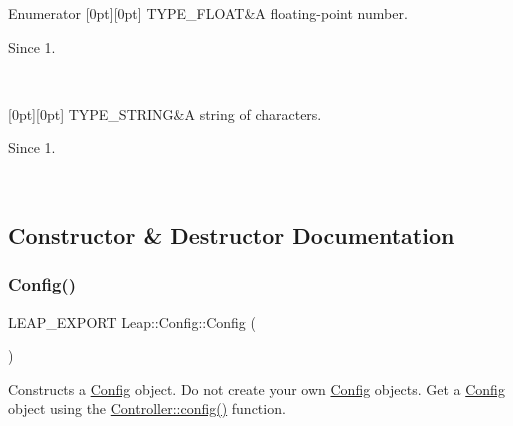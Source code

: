 \begin{DoxyEnumFields}{Enumerator}
[0pt][0pt]{}\mbox{\label{class_leap_1_1_config_aee9819af7eacacc324aa72619310a9d8a85ccbf5a55972697b350b394f7d87cfa}} 
T\+Y\+P\+E\+\_\+\+F\+L\+O\+AT&A floating-\/point number. \begin{DoxySince}{Since}
1. 
\end{DoxySince}
\\
\hline

[0pt][0pt]{}\mbox{\label{class_leap_1_1_config_aee9819af7eacacc324aa72619310a9d8a312ad72cfe51163b2817732f7530e04e}} 
T\+Y\+P\+E\+\_\+\+S\+T\+R\+I\+NG&A string of characters. \begin{DoxySince}{Since}
1. 
\end{DoxySince}
\\
\hline

\end{DoxyEnumFields}


\subsection{Constructor \& Destructor Documentation}
\mbox{\label{class_leap_1_1_config_aee58922e575e3e59ddf8da5af4f07878}} 
\subsubsection{\texorpdfstring{Config()}{Config()}}
{\footnotesize\ttfamily L\+E\+A\+P\+\_\+\+E\+X\+P\+O\+RT Leap\+::\+Config\+::\+Config (\begin{DoxyParamCaption}{ }\end{DoxyParamCaption})}

Constructs a \hyperlink{class_leap_1_1_config}{Config} object. Do not create your own \hyperlink{class_leap_1_1_config}{Config} objects. Get a \hyperlink{class_leap_1_1_config}{Config} object using the \hyperlink{class_leap_1_1_controller_ac042539e24f69b873662aa4e4d8ebcfe}{Controller\+::config()} function.


